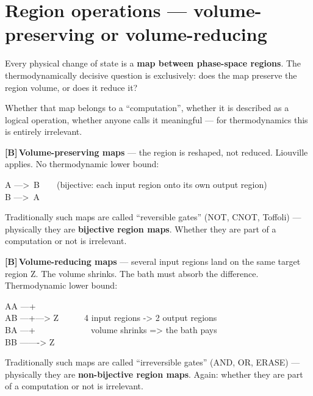 \documentclass[11pt,a4paper]{article}
\newcommand{\LB}{\textcolor{layB}{\textbf{\footnotesize\textsf{[B]}}}\,}
\begin{document}
\section{Region operations --- volume-preserving or volume-reducing}
\label{sec:regionops}

Every physical change of state is a \textbf{map between phase-space regions}. The
thermodynamically decisive question is exclusively: does the map preserve the
region volume, or does it reduce it?

Whether that map belongs to a “computation”, whether it is described as a logical
operation, whether anyone calls it meaningful --- for thermodynamics this is
entirely irrelevant.

\LB \textbf{Volume-preserving maps} --- the region is reshaped, not reduced.
Liouville applies. No thermodynamic lower bound:

\begin{center}
\begin{minipage}{0.78\textwidth}
\ttfamily\small
A --->\ B\ \ \ \ (bijective: each input region onto its own output region)\\
B --->\ A
\end{minipage}
\end{center}

Traditionally such maps are called “reversible gates” (NOT, CNOT, Toffoli) ---
physically they are \textbf{bijective region maps}. Whether they are part of a
computation or not is irrelevant.

\LB \textbf{Volume-reducing maps} --- several input regions land on the same
target region Z. The volume shrinks. The bath must absorb the difference.
Thermodynamic lower bound:

\begin{center}
\begin{minipage}{0.78\textwidth}
\ttfamily\small
AA ---+\\
AB ---+---> Z\ \ \ \ \ \ 4 input regions -> 2 output regions\\
BA ---+\ \ \ \ \ \ \ \ \ \ \ \ \ volume shrinks => the bath pays\\
BB -------> Z
\end{minipage}
\end{center}

Traditionally such maps are called “irreversible gates” (AND, OR, ERASE) ---
physically they are \textbf{non-bijective region maps}. Again: whether they are
part of a computation or not is irrelevant.
\end{document}
